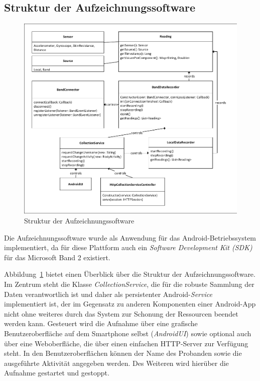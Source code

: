 \newpage

\subsection{Struktur der Aufzeichnungssoftware}

\begin{figure}[H]
	\centering
	\includegraphics[width=\textwidth, clip, trim=6mm 6mm 9mm 6mm]{img/app-structure}
	\caption{Struktur der Aufzeichnungssoftware}
	\label{fig:app-structure}
\end{figure}

Die Aufzeichnungssoftware wurde als Anwendung für das Android-Betriebssystem implementiert, da für diese Plattform auch ein \textit{Software Development Kit (SDK)} für das Microsoft Band 2 existiert.

Abbildung~\ref{fig:app-structure} bietet einen Überblick über die Struktur der Aufzeichnungssoftware. Im Zentrum steht die Klasse \textit{CollectionService}, die für die robuste Sammlung der Daten verantwortlich ist und daher als persistenter Android-\textit{Service} implementiert ist, der im Gegensatz zu anderen Komponenten einer Android-App nicht ohne weiteres durch das System zur Schonung der Ressourcen beendet werden kann. Gesteuert wird die Aufnahme über eine grafische Benutzeroberfläche auf dem Smartphone selbst (\textit{AndroidUI}) sowie optional auch über eine Weboberfläche, die über einen einfachen HTTP-Server zur Verfügung steht. In den Benutzeroberflächen können der Name des Probanden sowie die ausgeführte Aktivität angegeben werden. Des Weiteren wird hierüber die Aufnahme gestartet und gestoppt.

